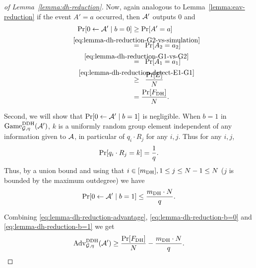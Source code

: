 \begin{proof}[of Lemma~\ref{lemma:dh-reduction}]
	Now, again analogous to Lemma~\ref{lemma:eav-reduction} if the event $A' = a$ occurred, then $\mathcal{A}'$ outputs $0$ and
	\begin{align*}
		\pr{0 \from \adv' \mid b = 0} & \ge \pr{A' = a}                                                                             \\
		                              & \stackrel{\mathclap{\eqref{eq:lemma-dh-reduction-G2-vs-simulation}}}{=} \;\; \pr{A_2 = a_2} \\
		                              & \stackrel{\mathclap{\eqref{eq:lemma-dh-reduction-G1-vs-G2}}}{=} \;\; \pr{A_1 = a_1}         \\
		                              & \stackrel{\mathclap{\eqref{eq:lemma-dh-reduction-detect-E1-G1}}}{\ge} \;\; \frac{\pr{E}}{N} \\
		                              & = \frac{\pr{\fdh}}{N}.
	\end{align*}

	Second, we will show that $\pr{0 \from \adv' \mid b = 1}$ is negligible. When $b = 1$ in $\mathrm{Game}_{\mathcal{G}, \eta}^{\mathrm{DDH}}(\mathcal{A}')$, $k$ is a uniformly random group element independent of any information given to $\mathcal{A}$, in particular of $q_i \cdot R_j$ for any $i, j$. Thus for any $i, j$,
	\[
		\pr{q_i \cdot R_j = k} = \frac{1}{q}.
	\]
	Thus, by a union bound and using that $i \in [m_\mathrm{DH}], 1 \le j \le N - 1 \le N$ ($j$ is bounded by the maximum outdegree) we have
	\begin{equation} \label{eq:lemma-dh-reduction-b=1}
		\pr{0 \from \adv' \mid b = 1} \le \frac{\mdh \cdot N}{q}.
	\end{equation}

	Combining \eqref{eq:lemma-dh-reduction-advantage}, \eqref{eq:lemma-dh-reduction-b=0} and \eqref{eq:lemma-dh-reduction-b=1} we get
	\begin{align} \label{eq:lemma-dh-reduction-advantage-lower-bound}
		\begin{split}
			\advantage{\mathcal{G}}{\eta}{DDH}(\adv') \ge \frac{\pr{\fdh}}{N} - \frac{\mdh \cdot N}{q}.
		\end{split}
	\end{align}


\end{proof}
